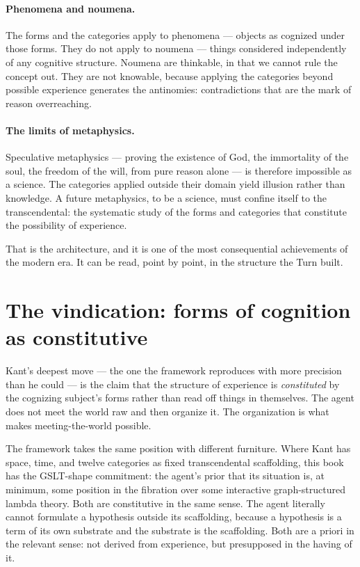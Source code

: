 \paragraph{Phenomena and noumena.}
The forms and the categories apply to phenomena --- objects as
cognized under those forms.
They do not apply to noumena --- things considered independently of
any cognitive structure.
Noumena are thinkable, in that we cannot rule the concept out.
They are not knowable, because applying the categories beyond
possible experience generates the antinomies: contradictions that
are the mark of reason overreaching.

\paragraph{The limits of metaphysics.}
Speculative metaphysics --- proving the existence of God, the
immortality of the soul, the freedom of the will, from pure reason
alone --- is therefore impossible as a science.
The categories applied outside their domain yield illusion rather
than knowledge.
A future metaphysics, to be a science, must confine itself to the
transcendental: the systematic study of the forms and categories
that constitute the possibility of experience.

That is the architecture, and it is one of the most consequential
achievements of the modern era.
It can be read, point by point, in the structure the Turn built.

\section{The vindication: forms of cognition as constitutive}
\label{sec:kant-vindication}

Kant's deepest move --- the one the framework reproduces with more
precision than he could --- is the claim that the structure of
experience is \emph{constituted} by the cognizing subject's forms
rather than read off things in themselves.
The agent does not meet the world raw and then organize it.
The organization is what makes meeting-the-world possible.

The framework takes the same position with different furniture.
Where Kant has space, time, and twelve categories as fixed
transcendental scaffolding, this book has the GSLT-shape
commitment: the agent's prior that its situation is, at minimum,
some position in the fibration over some interactive
graph-structured lambda theory.
Both are constitutive in the same sense.
The agent literally cannot formulate a hypothesis outside its
scaffolding, because a hypothesis is a term of its own substrate
and the substrate is the scaffolding.
Both are a priori in the relevant sense: not derived from
experience, but presupposed in the having of it.

